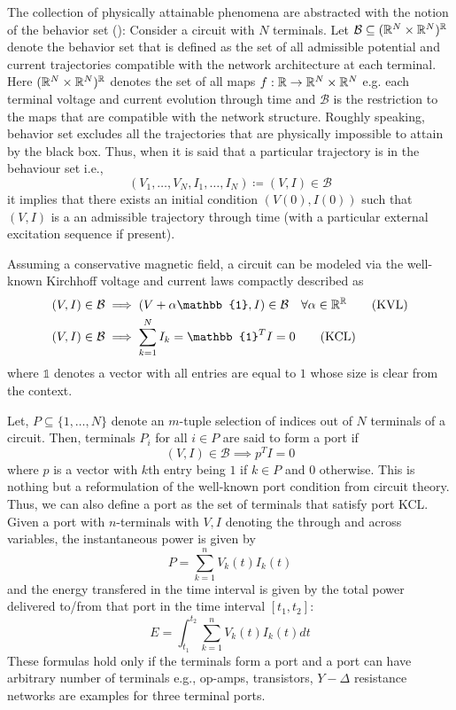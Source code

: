 The collection of physically attainable phenomena are abstracted with the notion of the behavior set (\cite{behavbook}):
Consider a circuit with $N$ terminals. Let $\mathcal{B}\subseteq (\mathbb{R}^N\times\mathbb{R}^N)^{\mathbb{R}}$ denote the behavior set 
that is defined as the set of all admissible potential and current trajectories compatible with the network architecture 
at each terminal. Here $(\mathbb{R}^N\times\mathbb{R}^N)^{\mathbb{R}}$ denotes 
the set of all maps $f: \mathbb{R}\to\mathbb{R}^N\times\mathbb{R}^N$ e.g. each terminal voltage and current evolution through time 
and $\mathcal{B}$ is the restriction to the maps that are compatible with the network structure. Roughly speaking, behavior
set excludes all the trajectories that are physically impossible to attain by the black box. Thus, when it is said that
a particular trajectory is in the behaviour set i.e., 
\[
(V_1,\ldots,V_N,I_1,\ldots,I_N)\coloneqq (V,I) \in\mathcal{B}
\]
it implies that there exists an initial condition $(V(0),I(0))$ such that $(V,I)$ is a an admissible trajectory through time
(with a particular external excitation sequence if present).


Assuming a conservative magnetic field, a circuit can be modeled via the well-known Kirchhoff voltage and current laws 
compactly described as 
\begin{align}
(V,I)\in\mathcal{B} &\implies (V+\alpha\mathbb{1},I)\in\mathcal{B} \quad \forall \alpha\in\Real^\Real \tag{KVL}\\
(V,I)\in\mathcal{B} &\implies \sum_{k=1}^N{I_k}=\mathbb{1}^TI=0 \tag{KCL}
\end{align}
where $\mathbb{1}$ denotes a vector with all entries are equal to $1$ whose size is clear from the context.

Let, $P \subseteq \{1,\ldots,N\}$ denote an $m$-tuple selection of indices out of $N$ terminals of a circuit. Then, terminals
$P_i$ for all $i\in P$ are said to form a port if 
\[
(V,I)\in\mathcal{B} \implies p^TI=0 \tag{Port KCL}
\]
where $p$ is a vector with $k$th entry being $1$ if $k\in P$ and $0$ otherwise. This is nothing but a reformulation of the well-known 
port condition from circuit theory. Thus, we can also define a port as the set of terminals that satisfy port KCL. Given a port with 
$n$-terminals with $V,I$ denoting the through and across variables, the instantaneous power is given by 
\[
P = \sum_{k=1}^n{V_k(t)I_k(t)}
\]
and the energy transfered in the time interval is given by the total power delivered
to/from that port in the time interval $[t_1,t_2]$: 
\[
E = \int^{t_{2}}_{t_{1}}\sum_{k=1}^n{V_k(t)I_k(t)}dt
\]
These formulas hold only if the terminals form a port and a port can have arbitrary number of terminals 
e.g., op-amps, transistors, $Y-\Delta$ resistance networks are examples for three terminal ports. 


